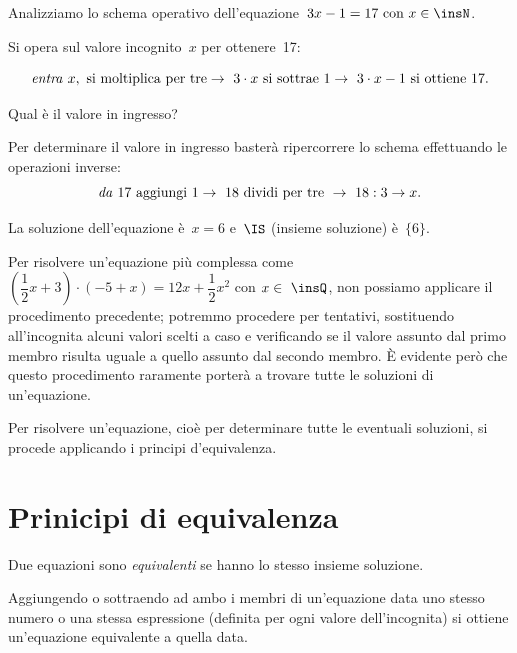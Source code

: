 \begin{exrig}
 \begin{esempio}
Analizziamo lo schema operativo dell'equazione~$3x-1=17 \text{ con } x\in\insN$.

Si opera sul valore incognito~$x$ per ottenere~17:

\[\text{\emph{entra} } x,\text{ si moltiplica per tre}\to~3\cdot x%
\text{ si sottrae } 1\to~3\cdot x-1 \text{ si ottiene } 17.\]

Qual è il valore in ingresso?

Per determinare il valore in ingresso basterà ripercorrere lo schema
 effettuando le operazioni inverse:
\[\text{\emph{da} } 17 \text{ aggiungi } 1\to~18 \text{ dividi per tre }\to~18:3 
\to x.\]

La soluzione dell'equazione è~$x = 6$ e~$\IS$ (insieme
soluzione) è~$\{6\}$.
 \end{esempio}
\end{exrig}


Per risolvere un'equazione più complessa come
$\left(\dfrac{1}{2}x+3\right)\cdot (-5+x)=12x+\dfrac{1}{2}x^{2}$ con
$x\in~\insQ$, non possiamo applicare il procedimento precedente; potremmo
procedere per tentativi, sostituendo all'incognita
alcuni valori scelti a caso e verificando se il valore assunto dal
primo membro risulta uguale a quello assunto dal secondo membro. È
evidente però che questo procedimento raramente porterà a trovare
tutte le soluzioni di un'equazione.

\osservazione
Per risolvere un'equazione, cioè per determinare tutte
le eventuali soluzioni, si procede applicando i principi
d'equivalenza.

\section{Prinicipi di equivalenza}
\label{sec:13_principi}

\begin{definizione}
 Due equazioni sono \emph{equivalenti} se hanno lo stesso insieme soluzione.
\end{definizione}

\begin{principio}
 Aggiungendo o sottraendo ad ambo i membri di
un'equazione data uno stesso numero o una stessa
espressione (definita per ogni valore dell'incognita)
si ottiene un'equazione equivalente a quella data.
\end{principio}

